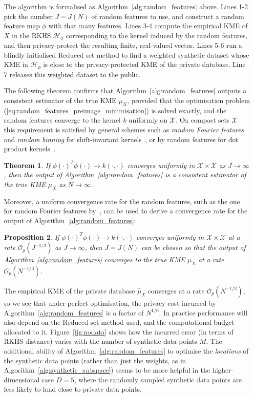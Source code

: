 \documentclass{article}
\newcommand{\calH}{\mathcal{H}}			%
\newcommand{\calO}{\mathcal{O}}			%
\newcommand{\calX}{\mathcal{X}}			%
\theoremstyle{plain}
\newtheorem{theorem}{Theorem}
\newtheorem{proposition}[theorem]{Proposition}
\theoremstyle{remark}
\theoremstyle{definition}
\begin{document}
The algorithm is formalised as Algorithm~\ref{alg:random_features} above. Lines 1-2 pick the number $J = J(N)$ of random features to use, and construct a random feature map $\phi$ with that many features. Lines 3-4 compute the empirical KME of $X$ in the RKHS $\calH_{\phi}$ corresponding to the kernel induced by the random features, and then privacy-protect the resulting finite, real-valued vector. Lines 5-6 run a blindly initialised Reduced set method to find a weighted synthetic dataset whose KME in $\calH_{\phi}$ is close to the privacy-protected KME of the private database. Line 7 releases this weighted dataset to the public.

The following theorem confirms that Algorithm~\ref{alg:random_features} outputs a consistent estimator of the true KME $\mu_X$, provided that the optimisation problem (\ref{eq:random_features_preimage_minimisation}) is solved exactly, and the random features converge to the kernel $k$ uniformly on $\calX$. On compact sets $\calX$ this requirement is satisfied by general schemes such as \emph{random Fourier features} and \emph{random binning} for shift-invariant kernels~\citep{rahimi_random_2007}, or by random features for dot product kernels~\cite{kar_dot_2012}.

\begin{theorem}
	\label{thm:random_features_consistency}
	If $\phi(\cdot)^T \phi(\cdot) \to k(\cdot, \cdot)$ converges uniformly in $\calX \times \calX$ as $J \to \infty$, then the output of Algorithm~\ref{alg:random_features} is a consistent estimator of the true KME $\mu_X$ as $N \to \infty$.
\end{theorem}

Moreover, a uniform convergence rate for the random features, such as the one for random Fourier features by~\citet{sriperumbudur_optimal_2015}, can be used to derive a convergence rate for the output of Algorithm~\ref{alg:random_features}:

\begin{proposition}
If $\phi(\cdot)^T \phi(\cdot) \to k(\cdot, \cdot)$ converges uniformly in $\calX \times \calX$ at a rate $\calO_p(J^{-1/2})$ as $J \to \infty$, then $J = J(N)$ can be chosen so that the output of Algorithm~\ref{alg:random_features} converges to the true KME $\mu_X$ at a rate $\calO_p(N^{-1/3})$.
\end{proposition}

The empirical KME of the private database $\hat{\mu}_X$ converges at a rate $\calO_p(N^{-1/2})$, so we see that under perfect optimisation, the privacy cost incurred by Algorithm~\ref{alg:random_features} is a factor of $N^{1/6}$. In practice performance will also depend on the Reduced set method used, and the computational budget allocated to it. Figure~\ref{fig:nodata} shows how the incurred error (in terms of RKHS distance) varies with the number of synthetic data points $M$. The additional ability of Algorithm~\ref{alg:random_features} to optimise the \emph{locations} of the synthetic data points (rather than just the weights, as in Algorithm~\ref{alg:synthetic_subspace}) seems to be more helpful in the higher-dimensional case $D = 5$, where the randomly sampled synthetic data points are less likely to land close to private data points.
\end{document}
